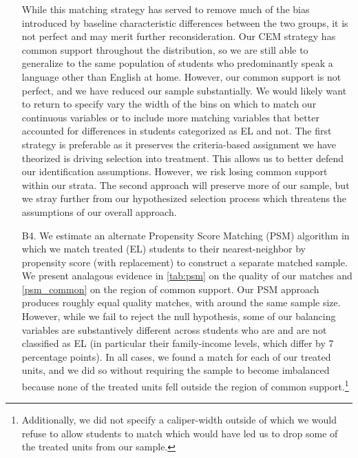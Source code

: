 \documentclass[a4paper, 11pt]{article}
\begin{document}
\begin{enumerate}
	While this matching strategy has served to remove much of the bias introduced by baseline characteristic differences between the two groups, it is not perfect and may merit further reconsideration. Our CEM strategy has common support throughout the distribution, so we are still able to generalize to the same population of students who predominantly speak a language other than English at home. However, our common support is not perfect, and we have reduced our sample substantially. We would likely want to return to specify vary the width of the bins on which to match our continuous variables or to include more matching variables that better accounted for differences in students categorized as EL and not. The first strategy is preferable as it preserves the criteria-based assignment we have theorized is driving selection into treatment. This allows us to better defend our identification assumptions. However, we risk losing common support within our strata. The second approach will preserve more of our sample, but we stray further from our hypothesized selection process which threatens the assumptions of our overall approach.

	\item[B4.] We estimate an alternate Propensity Score Matching (PSM) algorithm in which we match treated (EL) students to their nearest-neighbor by propensity score (with replacement) to construct a separate matched sample. We present analagous evidence in \autoref{tab:psm} on the quality of our matches and \autoref{psm_common} on the region of common support. Our PSM approach produces roughly equal quality matches, with around the same sample size. However, while we fail to reject the null hypothesis, some of our balancing variables are substantively different across students who are and are not classified as EL (in particular their family-income levels, which differ by 7 percentage points). In all cases, we found a match for each of our treated units, and we did so without requiring the sample to become imbalanced because none of the treated units fell outside the region of common support.\footnote{Additionally, we did not specify a caliper-width outside of which we would refuse to allow students to match which would have led us to drop some of the treated units from our sample.}


\end{enumerate}
\end{document}
